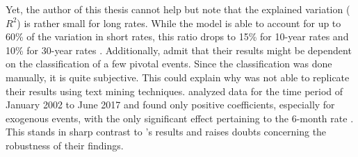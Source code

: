 \documentclass[11pt,a4paper,english,oneside]{book}
\numberwithin{equation}{chapter}
\begin{document}
Yet, the author of this thesis cannot help but note that the explained variation ($R^2$) is rather small for long rates. While the model is able to account for up to 60\% of the variation in short rates, this ratio drops to 15\% for 10-year rates and 10\% for 30-year rates \citep[~p. 16]{Ellingsen.2003}. Additionally, \citet[~p. 20]{Ellingsen.2003} admit that their results might be dependent on the classification of a few pivotal events. Since the classification was done manually, it is quite subjective. This could explain why \cite{Krosigk.2017} was not able to replicate their results using text mining techniques.  analyzed data for the time period of January 2002 to June 2017 and found only positive coefficients, especially for exogenous events, with the only significant effect pertaining to the 6-month rate \citeyearpar[~p. 36]{Krosigk.2017}. This stands in sharp contrast to \citeauthor{Ellingsen.2003}'s results and raises doubts concerning the robustness of their findings.
\end{document}
